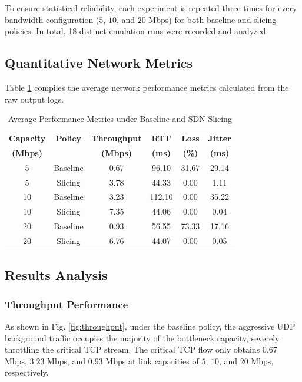 \documentclass[conference]{IEEEtran}
\begin{document}
To ensure statistical reliability, each experiment is repeated three times for every bandwidth configuration ($5$, $10$, and $20$ Mbps) for both baseline and slicing policies. In total, 18 distinct emulation runs were recorded and analyzed.

\subsection{Quantitative Network Metrics}
Table \ref{tab:results} compiles the average network performance metrics calculated from the raw output logs.

\begin{table}[htbp]
\caption{Average Performance Metrics under Baseline and SDN Slicing}
\begin{center}
\begin{tabular}{cccccc}
\toprule
\textbf{Capacity} & \textbf{Policy} & \textbf{Throughput} & \textbf{RTT} & \textbf{Loss} & \textbf{Jitter} \\
\textbf{(Mbps)} & & \textbf{(Mbps)} & \textbf{(ms)} & \textbf{(\%)} & \textbf{(ms)} \\
\midrule
5 & Baseline & 0.67 & 96.10 & 31.67 & 29.14 \\
5 & Slicing  & 3.78 & 44.33 & 0.00  & 1.11  \\
\midrule
10 & Baseline & 3.23 & 112.10 & 0.00 & 35.22 \\
10 & Slicing  & 7.35 & 44.06 & 0.00  & 0.04  \\
\midrule
20 & Baseline & 0.93 & 56.55 & 73.33 & 17.16 \\
20 & Slicing  & 6.76 & 44.07 & 0.00  & 0.05  \\
\bottomrule
\end{tabular}
\label{tab:results}
\end{center}
\end{table}

\subsection{Results Analysis}

\subsubsection{Throughput Performance}
As shown in Fig. \ref{fig:throughput}, under the baseline policy, the aggressive UDP background traffic occupies the majority of the bottleneck capacity, severely throttling the critical TCP stream. The critical TCP flow only obtains $0.67$ Mbps, $3.23$ Mbps, and $0.93$ Mbps at link capacities of $5$, $10$, and $20$ Mbps, respectively. 
\end{document}
